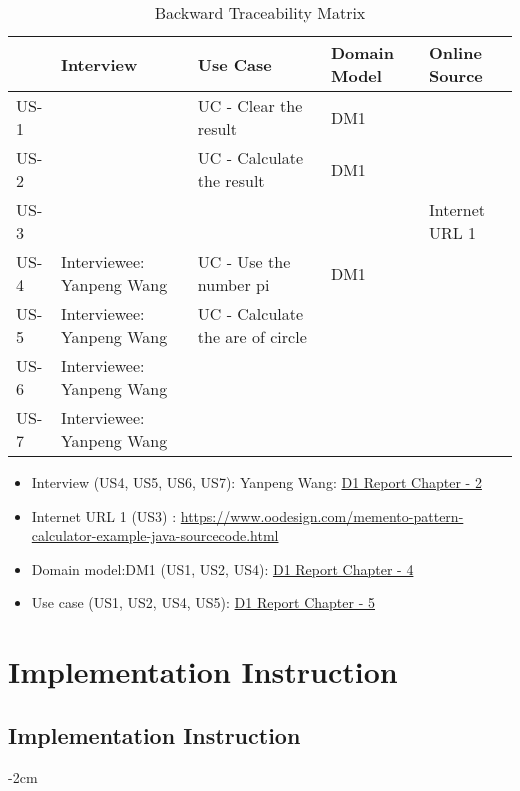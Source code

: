 \documentclass[12pt]{report}
\begin{document}
{\begin{table}[!ht]
\begin{tabular}{|p{2cm}|p{3cm}|p{3cm}|p{3cm}|p{3cm}|}

\hline
& Interview & Use Case & Domain Model & Online Source  \\
\hline
US-1 & & UC - Clear the result &  DM1    & \\
\hline
US-2 & & UC - Calculate the result & DM1   & \\
\hline
US-3& && &Internet URL 1\\
\hline
US-4& Interviewee: Yanpeng Wang & UC - Use the number pi& DM1  & \\
\hline
US-5& Interviewee: Yanpeng Wang & UC - Calculate the are of circle&&\\
\hline

US-6& Interviewee: Yanpeng Wang &&&\\
\hline

US-7& Interviewee: Yanpeng Wang &&&\\
\hline

\hline

\end{tabular}
\caption{Backward Traceability Matrix}
\end{table}

     \begin{itemize}
     \item Interview (US4, US5, US6, US7): Yanpeng Wang: \href{ }{
         D1 Report Chapter - 2
     }
     \item  Internet URL 1  (US3) \citep{oodesign:memento}: \href{ https://www.oodesign.com/memento-pattern-calculator-example-java-sourcecode.html 
    }{ https://www.oodesign.com/memento-pattern-calculator-example-java-sourcecode.html} 

    \item Domain model:DM1 (US1, US2, US4):  \href{ }{
     D1 Report Chapter - 4
     }
     \item Use case (US1, US2, US4, US5):  \href{ }{
     D1 Report Chapter - 5
     }

\end{itemize}


\chapter{Implementation Instruction } 

\section{Implementation Instruction}
\begin{table}[!ht]
\centering
\addtolength{\leftskip} {-2cm}
\addtolength{\rightskip}{-2cm}


\end{table}}
\end{document}
